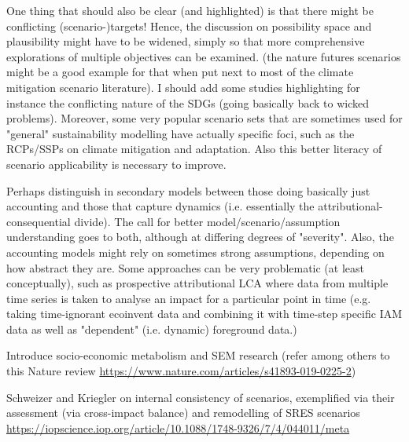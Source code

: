 \documentclass{article}
\begin{document}
One thing that should also be clear (and highlighted) is that there might be conflicting (scenario-)targets! Hence, the discussion on possibility space and plausibility might have to be widened, simply so that more comprehensive explorations of multiple objectives can be examined. (the nature futures scenarios might be a good example for that when put next to most of the climate mitigation scenario literature). I should add some studies highlighting for instance the conflicting nature of the SDGs (going basically back to wicked problems). Moreover, some very popular scenario sets that are sometimes used for "general" sustainability modelling have actually specific foci, such as the RCPs/SSPs on climate mitigation and adaptation. Also this better literacy of scenario applicability is necessary to improve.

Perhaps distinguish in secondary models between those doing basically just accounting and those that capture dynamics (i.e. essentially the attributional-consequential divide). The call for better model/scenario/assumption understanding goes to both, although at differing degrees of "severity". Also, the accounting models might rely on sometimes strong assumptions, depending on how abstract they are. Some approaches can be very problematic (at least conceptually), such as prospective attributional LCA where data from multiple time series is taken to analyse an impact for a particular point in time (e.g. taking time-ignorant ecoinvent data and combining it with time-step specific IAM data as well as "dependent" (i.e. dynamic) foreground data.)

Introduce socio-economic metabolism and SEM research (refer among others to this Nature review \url{https://www.nature.com/articles/s41893-019-0225-2})

Schweizer and Kriegler on internal consistency of scenarios, exemplified via their assessment (via cross-impact balance) and remodelling of SRES scenarios \url{https://iopscience.iop.org/article/10.1088/1748-9326/7/4/044011/meta}
\end{document}
